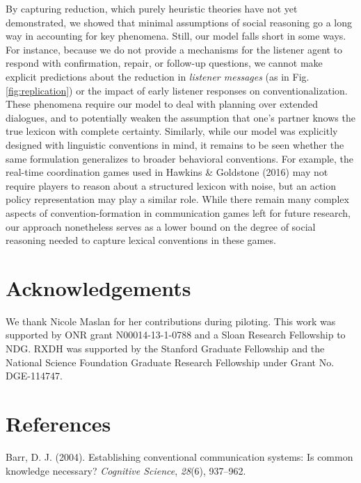 \documentclass[10pt, letterpaper]{article}
\begin{document}
By capturing reduction, which purely heuristic theories have not yet
demonstrated, we showed that minimal assumptions of social reasoning go
a long way in accounting for key phenomena. Still, our model falls short
in some ways. For instance, because we do not provide a mechanisms for
the listener agent to respond with confirmation, repair, or follow-up
questions, we cannot make explicit predictions about the reduction in
\emph{listener messages} (as in Fig. \ref{fig:replication}) or the
impact of early listener responses on conventionalization. These
phenomena require our model to deal with planning over extended
dialogues, and to potentially weaken the assumption that one's partner
knows the true lexicon with complete certainty. Similarly, while our
model was explicitly designed with linguistic conventions in mind, it
remains to be seen whether the same formulation generalizes to broader
behavioral conventions. For example, the real-time coordination games
used in Hawkins \& Goldstone (2016) may not require players to reason
about a structured lexicon with noise, but an action policy
representation may play a similar role. While there remain many complex
aspects of convention-formation in communication games left for future
research, our approach nonetheless serves as a lower bound on the degree
of social reasoning needed to capture lexical conventions in these
games.

\section{Acknowledgements}\label{acknowledgements}

\small We thank Nicole Maslan for her contributions during piloting.
This work was supported by ONR grant N00014-13-1-0788 and a Sloan
Research Fellowship to NDG. RXDH was supported by the Stanford Graduate
Fellowship and the National Science Foundation Graduate Research
Fellowship under Grant No. DGE-114747.

\section{References}\label{references}

\setlength{\parindent}{-0.1in} \setlength{\leftskip}{0.125in} \noindent

\hypertarget{refs}{}
\hypertarget{ref-Barr2004_ConventionalCommunicationSystems}{}
Barr, D. J. (2004). Establishing conventional communication systems: Is
common knowledge necessary? \emph{Cognitive Science}, \emph{28}(6),
937--962.
\end{document}
